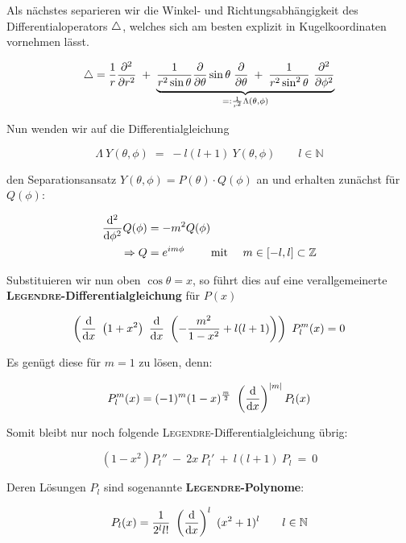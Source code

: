 Als nächstes separieren wir die Winkel- und Richtungsabhängigkeit des Differentialoperators $\mathop{{}\bigtriangleup}\nolimits$, welches sich am besten explizit in Kugelkoordinaten vornehmen lässt.

\begin{equation*}
\laplace = \frac{1}{r} \pddiff{}{r}  \; +\; \underbrace{\frac{1}{r^2 \sin\theta} \pdiff{}{\theta} \sin\theta \; \pdiff{}{\theta} \; + \; \frac{1}{r^2 \sin^2\theta} \ \pddiff{}{\phi}}_{=: \frac{1}{r^2}\Lambda(\theta,\phi)}
\end{equation*}

Nun wenden wir auf die Differentialgleichung

\begin{equation*}
\Lambda \ Y(\theta,\phi) \; = \; -l(l+1) \ Y(\theta,\phi) \qquad l \in \mathbb{N}
\end{equation*}

den Separationsansatz $Y(\theta,\phi) = P(\theta)\cdot Q(\phi)$ an und erhalten zunächst für $Q(\phi)$:

\begin{align*}
\frac{\mathrm{d}^2{}}{\mathrm{d}{\phi}^2}Q(\phi) &= - m^2 Q(\phi)\\
\Rightarrow Q &= e^{im\phi} \qquad \text{ mit } \quad m \in [-l,l] \subset \mathbb{Z}
\end{align*}

Substituieren wir nun oben $\cos\theta = x$, so führt dies auf eine verallgemeinerte \textbf{\textsc{Legendre}-Differentialgleichung} für $P(x)$

\begin{equation*}
\left(\diff{}{x} \ \left(1+x^2\right) \ \diff{}{x} \ \left(-\frac{m^2}{1-x^2} + l(l+1)\right)\right) \ P_l^m(x) = 0
\end{equation*}

Es genügt diese für $m=1$ zu lösen, denn:

\begin{equation*}
P_l^m(x) = (-1)^m(1-x)^{\frac{m}{2}} \ \left(\diff{}{x}\right)^{|m|} P_l(x)
\end{equation*}

Somit bleibt nur noch folgende \textsc{Legendre}-Differentialgleichung übrig:

\begin{equation*}
(1-x^2) P_l'' \ - \ 2x \ P_l' \ + \ l(l+1) \ P_l \ = \ 0
\end{equation*}

Deren Lösungen $P_l$ sind sogenannte \textbf{\textsc{Legendre}-Polynome}:

\begin{equation*}
P_l(x) = \frac{1}{2^l l!} \ \left(\diff{}{x}\right)^l \ (x^2+1)^l \qquad l\in \mathbb{N}
\end{equation*}

